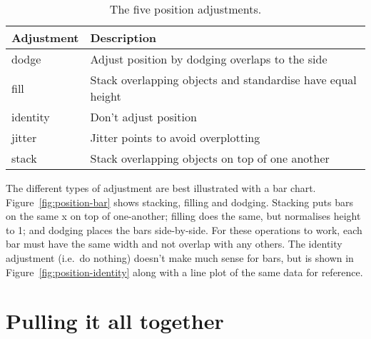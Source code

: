 \begin{table}
  \begin{center}
  \begin{tabular}{ll}
    \toprule
    Adjustment & Description  \\
    \midrule
    dodge     & Adjust position by dodging overlaps to the side \\
    fill      & Stack overlapping objects and standardise have equal height\\
    identity  & Don't adjust position \\
    jitter    & Jitter points to avoid overplotting \\
    stack     & Stack overlapping objects on top of one another \\
    \bottomrule
  \end{tabular}
  \end{center}
  \caption{The five position adjustments.}
  \label{fig:position}
\end{table}

The different types of adjustment are best illustrated with a bar chart.  Figure~\ref{fig:position-bar} shows stacking, filling and dodging.  Stacking puts bars on the same x on top of one-another; filling does the same, but normalises height to 1; and dodging places the bars side-by-side.  For these operations to work, each bar must have the same width and not overlap with any others.  The identity adjustment (i.e.\ do nothing) doesn't make much sense for bars, but is shown in Figure~\ref{fig:position-identity} along with a line plot of the same data for reference.

% 


% 


\section{Pulling it all together}
\label{sec:pull-together}

